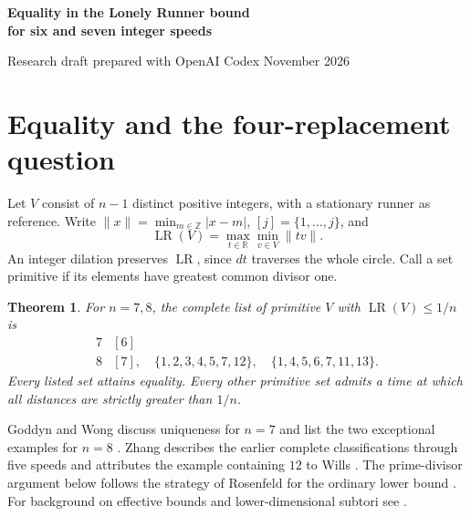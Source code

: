 \documentclass[11pt,a4paper]{article}
\newtheorem{theorem}{Theorem}
\newcommand{\LR}{\operatorname{LR}}
\newcommand{\nn}[1]{\lVert #1\rVert}
\begin{document}
\begin{center}
{\LARGE\bfseries Equality in the Lonely Runner bound\\[3pt]for six and seven integer speeds\par}
\medskip
Research draft prepared with OpenAI Codex  November 2026
\end{center}
\begin{abstract}
For six distinct positive integer speeds we give a computer-assisted proof that
only dilations of the consecutive speeds attain maximum loneliness $1/7$.
For seven speeds the corresponding equality at $1/8$ has three primitive
solutions. All four examples were known. The issue is completeness at
arbitrarily large speeds. The proof uses lower-dimensional lonely-runner
bounds, a simultaneous approximation, and explicit prime-modulus cover lists.
A short representative of a modular cover either yields a strictly better
time or determines the original speed ratios. Two enumerators are supplied.
\end{abstract}

\section{Equality and the four-replacement question}
Let $V$ consist of $n-1$ distinct positive integers, with a stationary runner
as reference. Write $\nn{x}=\min_{m\in\mathbb Z}|x-m|$,
$[j]=\{1,\ldots,j\}$, and
\[
  \LR(V)=\max_{t\in\mathbb R}\min_{v\in V}\nn{tv}.
\]
An integer dilation preserves $\LR$, since $dt$ traverses the whole circle.
Call a set primitive if its elements have greatest common divisor one.
\begin{theorem}\label{main}
For $n=7,8$, the complete list of primitive $V$ with $\LR(V)\le 1/n$ is
\[
\begin{array}{c|l}
7 &[6]\\
8 &[7],\quad \{1,2,3,4,5,7,12\},\quad \{1,4,5,6,7,11,13\}.
\end{array}
\]
Every listed set attains equality. Every other primitive set admits a time
at which all distances are strictly greater than $1/n$.
\end{theorem}
Goddyn and Wong discuss uniqueness for $n=7$ and list the two exceptional
examples for $n=8$ \cite{GW}. Zhang describes the earlier complete
classifications through five speeds and attributes the example containing
$12$ to Wills \cite[Sec.~1.2]{Z}. The prime-divisor argument below follows
the strategy of Rosenfeld for the ordinary lower bound \cite{R}. For background
on effective bounds and lower-dimensional subtori see \cite{GK,MSS,JA}.
\end{document}
